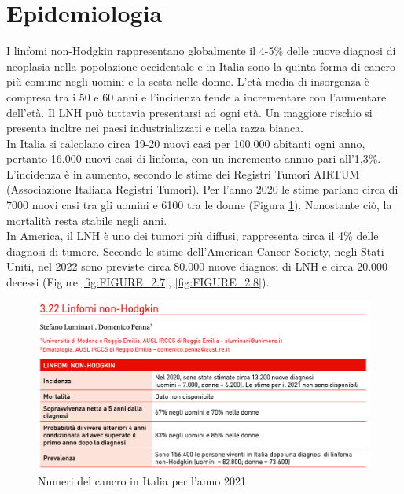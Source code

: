 \section{Epidemiologia}
I linfomi non-Hodgkin rappresentano globalmente il 4-5\% delle nuove diagnosi di neoplasia nella popolazione 
occidentale e in Italia sono la quinta forma di cancro più comune negli uomini e la sesta nelle donne\cite{AIOM}. 
L’età media di insorgenza è compresa tra i 50 e 60 anni e l’incidenza tende a incrementare con l’aumentare dell’età. 
Il LNH può tuttavia presentarsi ad ogni età.
Un maggiore rischio si presenta inoltre nei paesi industrializzati e nella razza bianca\cite{AMERICANCS}.\\ 
In Italia si calcolano circa 19-20 nuovi casi per 100.000 abitanti ogni anno, pertanto 16.000 nuovi casi di linfoma, 
con un incremento annuo pari all’1,3\%\cite{AIOM}.\\
L’incidenza è in aumento, secondo le stime dei Registri Tumori AIRTUM (Associazione Italiana Registri Tumori).
Per l’anno 2020 le stime parlano circa di 7000 nuovi casi tra gli uomini e 6100 tra le donne (Figura \ref{fig:FIGURE_2.3}). 
Nonostante ciò, la mortalità resta stabile negli anni\cite{AIRC}.\\
In America, il LNH è uno dei tumori più diffusi, rappresenta circa il 4\% delle diagnosi di tumore\cite{Americanstatistic}. 
Secondo le stime dell’American Cancer Society, negli Stati Uniti, nel 2022 sono previste circa 80.000 nuove 
diagnosi di LNH e circa 20.000 decessi (Figure \ref{fig:FIGURE_2.7}, \ref{fig:FIGURE_2.8}).

\begin{figure}[H]
    \begin{center}
    \includegraphics[width=0.8\columnwidth]{img/2021.png}
    \vspace{-3mm}
    \end{center}
    \caption{Numeri del cancro in Italia per l’anno 2021
    \cite{img4-6-7}}
    \label{fig:FIGURE_2.3}
\end{figure}

